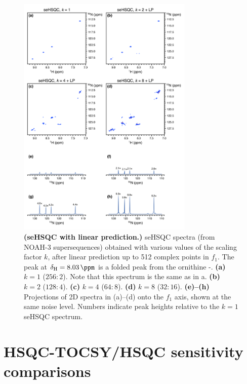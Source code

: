 \begin{figure}
    \centering
    \includegraphics[width=0.75\textwidth]{./figures/spv2_kscale_lp.png}
    \caption{
        \textbf{(seHSQC with linear prediction.)}
        \nitrogen{} seHSQC spectra (from NOAH-3  supersequences) obtained with various values of the scaling factor $k$, after linear prediction up to 512 complex points in $f_1$.
        The peak at $\delta_{\ce{H}} = \SI{8.03}{\ppm}$ is a folded peak from the ornithine \textdelta-.
        \textbf{(a)} $k = 1$ ($256:2$). Note that this spectrum is the same as in a.
        \textbf{(b)} $k = 2$ ($128:4$).
        \textbf{(c)} $k = 4$ ($64:8$).
        \textbf{(d)} $k = 8$ ($32:16$).
        \textbf{(e)--(h)} Projections of 2D spectra in (a)--(d) onto the $f_1$ axis, shown at the same noise level.
        Numbers indicate peak heights relative to the $k = 1$ seHSQC spectrum.
        \grami{}
    }
    \label{fig:spv2_kscale_lp}
\end{figure}

\section{HSQC-TOCSY/HSQC sensitivity comparisons}

